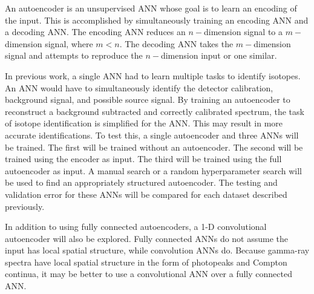 \documentclass[tocnosub,noragright,centerchapter,12pt,fullpage]{uiucecethesis09}
\begin{document}

An autoencoder is an unsupervised ANN whose goal is to learn an encoding of the input. This is accomplished by simultaneously training an encoding ANN and a decoding ANN. The encoding ANN reduces an $n-$dimension signal to a $m-$dimension signal, where $m < n$. The decoding ANN takes the $m-$dimension signal and attempts to reproduce the $n-$dimension input or one similar.

In previous work, a single ANN had to learn multiple tasks to identify isotopes. An ANN would have to simultaneously identify the detector calibration, background signal, and possible source signal. By training an autoencoder to reconstruct a background subtracted and correctly calibrated spectrum, the task of isotope identification is simplified for the ANN. This may result in more accurate identifications. To test this, a single autoencoder and three ANNs will be trained. The first will be trained without an autoencoder. The second will be trained using the encoder as input. The third will be trained using the full autoencoder as input. A manual search or a random hyperparameter search will be used to find an appropriately structured autoencoder. The testing and validation error for these ANNs will be compared for each dataset described previously.


In addition to using fully connected autoencoders, a 1-D convolutional autoencoder will also be explored. Fully connected ANNs do not assume the input has local spatial structure, while convolution ANNs do. Because gamma-ray spectra have local spatial structure in the form of photopeaks and Compton continua, it may be better to use a convolutional ANN over a fully connected ANN.


\end{document}
